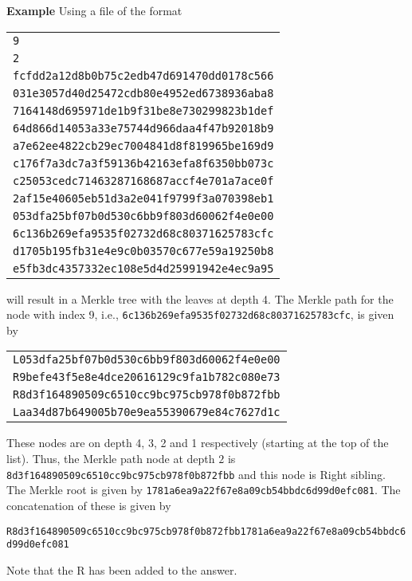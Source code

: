 \documentclass{article}
\begin{document}
\begin{description}
		{\bf Example} Using a file of the format
		\begin{center}
			\begin{tabular}{l}
				\texttt{9}\\
				\texttt{2}\\
				\texttt{fcfdd2a12d8b0b75c2edb47d691470dd0178c566}\\
				\texttt{031e3057d40d25472cdb80e4952ed6738936aba8}\\
				\texttt{7164148d695971de1b9f31be8e730299823b1def}\\
				\texttt{64d866d14053a33e75744d966daa4f47b92018b9}\\
				\texttt{a7e62ee4822cb29ec7004841d8f819965be169d9}\\
				\texttt{c176f7a3dc7a3f59136b42163efa8f6350bb073c}\\
				\texttt{c25053cedc71463287168687accf4e701a7ace0f}\\
				\texttt{2af15e40605eb51d3a2e041f9799f3a070398eb1}\\
				\texttt{053dfa25bf07b0d530c6bb9f803d60062f4e0e00}\\
				\texttt{6c136b269efa9535f02732d68c80371625783cfc}\\
				\texttt{d1705b195fb31e4e9c0b03570c677e59a19250b8}\\
				\texttt{e5fb3dc4357332ec108e5d4d25991942e4ec9a95}
			\end{tabular}
		\end{center}
		will result in a Merkle tree with the leaves at depth 4. The Merkle path for the node with index 9, i.e., \texttt{6c136b269efa9535f02732d68c80371625783cfc}, is given by 
		\begin{center}
			\begin{tabular}{l}
				\texttt{L053dfa25bf07b0d530c6bb9f803d60062f4e0e00}\\
				\texttt{R9befe43f5e8e4dce20616129c9fa1b782c080e73}\\
				\texttt{R8d3f164890509c6510cc9bc975cb978f0b872fbb}\\
				\texttt{Laa34d87b649005b70e9ea55390679e84c7627d1c}\\
			\end{tabular}
		\end{center}
		These nodes are on depth 4, 3, 2 and 1 respectively (starting at the top of the list). Thus, the Merkle path node at depth $2$ is \texttt{8d3f164890509c6510cc9bc975cb978f0b872fbb} and this node is Right sibling. The Merkle root is given by \texttt{1781a6ea9a22f67e8a09cb54bbdc6d99d0efc081}. The concatenation of these is given by
		\begin{center}
			\texttt{R8d3f164890509c6510cc9bc975cb978f0b872fbb1781a6ea9a22f67e8a09cb54bbdc6d99d0efc081}
		\end{center}
		Note that the R has been added to the answer.
		

\end{description}
\end{document}
